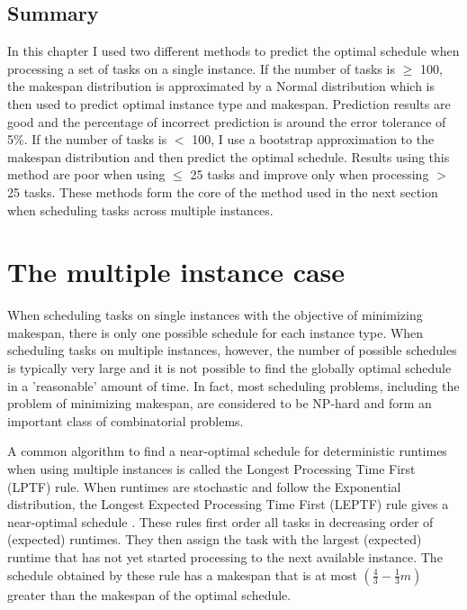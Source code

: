 \documentclass[12pt]{report}
\begin{document}
\section{Summary}
In this chapter I used two different methods to predict the optimal schedule when processing a set of tasks on a single instance. 
If the number of tasks is $\geq$ 100, the makespan distribution is approximated by a Normal distribution which is then used to predict optimal instance type and makespan. 
Prediction results are good and the percentage of incorrect prediction is around the error tolerance of 5\%. 
If the number of tasks is $<$ 100, I use a bootstrap approximation to the makespan distribution and then predict the optimal schedule. 
Results using this method are poor when using $\leq$ 25 tasks and improve only when processing $>$ 25 tasks.
These methods form the core of the method used in the next section when scheduling tasks across multiple instances.

\chapter{The multiple instance case}

When scheduling tasks on single instances with the objective of minimizing makespan, there is only one possible schedule for each instance type.
When scheduling tasks on multiple instances, however, the number of possible schedules is typically very large and it is not possible to find the globally optimal schedule in a 'reasonable' amount of time.
In fact, most scheduling problems, including the problem of minimizing makespan, are considered to be NP-hard \cite{Garey1979} and form an important class of combinatorial problems.

A common algorithm to find a near-optimal schedule for deterministic runtimes when using multiple instances is called the Longest Processing Time First (LPTF) rule.
When runtimes are stochastic and follow the Exponential distribution, the Longest Expected Processing Time First (LEPTF) rule gives a near-optimal schedule \cite{Pinedo2012}. 
These rules first order all tasks in decreasing order of (expected) runtimes.
They then assign the task with the largest (expected) runtime that has not yet started processing to the next available instance. 
The schedule obtained by these rule has a makespan that is at most $\left(\frac{4}{3} - \frac{1}{3}m \right)$ greater than the makespan of the optimal schedule.
\end{document}
